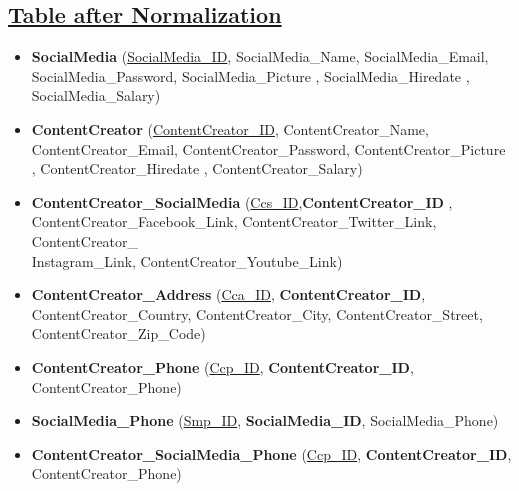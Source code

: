 \subsection*{\underline{Table after Normalization}}
\begin{itemize}
    \item \textbf{SocialMedia} (\underline{SocialMedia\_ID}, SocialMedia\_Name, SocialMedia\_Email, SocialMedia\_Password, SocialMedia\_Picture , SocialMedia\_Hiredate , SocialMedia\_Salary)
    \item \textbf{ContentCreator} (\underline{ContentCreator\_ID}, ContentCreator\_Name, ContentCreator\_Email, ContentCreator\_Password, ContentCreator\_Picture , ContentCreator\_Hiredate , ContentCreator\_Salary)
    \item \textbf{ContentCreator\_SocialMedia} (\underline{Ccs\_ID},\textbf{ContentCreator\_ID} , ContentCreator\_Facebook\_Link, ContentCreator\_Twitter\_Link, ContentCreator\_\\Instagram\_Link, ContentCreator\_Youtube\_Link)
    \item \textbf{ContentCreator\_Address} (\underline{Cca\_ID}, \textbf{ContentCreator\_ID}, ContentCreator\_Country, ContentCreator\_City, ContentCreator\_Street, ContentCreator\_Zip\_Code)
    \item \textbf{ContentCreator\_Phone} (\underline{Ccp\_ID}, \textbf{ContentCreator\_ID}, ContentCreator\_Phone)
    \item \textbf{SocialMedia\_Phone} (\underline{Smp\_ID}, \textbf{SocialMedia\_ID}, SocialMedia\_Phone)
    \item \textbf{ContentCreator\_SocialMedia\_Phone} (\underline{Ccp\_ID}, \textbf{ContentCreator\_ID}, ContentCreator\_Phone)

\end{itemize}

\clearpage